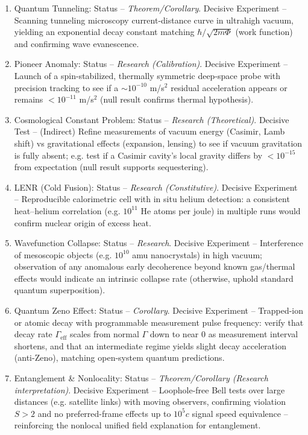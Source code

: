 \documentclass[11pt]{article}
\begin{document}
\begin{enumerate}
\item 
Quantum Tunneling: Status – \textit{Theorem/Corollary}. Decisive Experiment – Scanning tunneling microscopy current-distance curve in ultrahigh vacuum, yielding an exponential decay constant matching $\hbar/\sqrt{2m\Phi}$ (work function) and confirming wave evanescence.




\item 
Pioneer Anomaly: Status – \textit{Research (Calibration)}. Decisive Experiment – Launch of a spin-stabilized, thermally symmetric deep-space probe with precision tracking to see if a $\sim10^{-10}$ m/s$^2$ residual acceleration appears or remains $<10^{-11}$ m/s$^2$ (null result confirms thermal hypothesis).




\item 
Cosmological Constant Problem: Status – \textit{Research (Theoretical)}. Decisive Test – (Indirect) Refine measurements of vacuum energy (Casimir, Lamb shift) vs gravitational effects (expansion, lensing) to see if vacuum gravitation is fully absent; e.g. test if a Casimir cavity’s local gravity differs by $<10^{-15}$ from expectation (null result supports sequestering).




\item 
LENR (Cold Fusion): Status – \textit{Research (Constitutive)}. Decisive Experiment – Reproducible calorimetric cell with in situ helium detection: a consistent heat–helium correlation (e.g. $10^{11}$ He atoms per joule) in multiple runs would confirm nuclear origin of excess heat.




\item 
Wavefunction Collapse: Status – \textit{Research}. Decisive Experiment – Interference of mesoscopic objects (e.g. $10^{10}$ amu nanocrystals) in high vacuum; observation of any anomalous early decoherence beyond known gas/thermal effects would indicate an intrinsic collapse rate (otherwise, uphold standard quantum superposition).




\item 
Quantum Zeno Effect: Status – \textit{Corollary}. Decisive Experiment – Trapped-ion or atomic decay with programmable measurement pulse frequency: verify that decay rate $\Gamma_{\text{eff}}$ scales from normal $\Gamma$ down to near 0 as measurement interval shortens, and that an intermediate regime yields slight decay acceleration (anti-Zeno), matching open-system quantum predictions.




\item 
Entanglement & Nonlocality: Status – \textit{Theorem/Corollary (Research interpretation)}. Decisive Experiment – Loophole-free Bell tests over large distances (e.g. satellite links) with moving observers, confirming violation $S>2$ and no preferred-frame effects up to $10^5 c$ signal speed equivalence – reinforcing the nonlocal unified field explanation for entanglement.


\end{enumerate}
\end{document}
